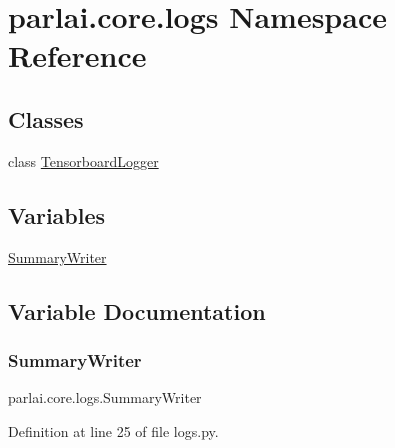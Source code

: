 \hypertarget{namespaceparlai_1_1core_1_1logs}{}\section{parlai.\+core.\+logs Namespace Reference}
\label{namespaceparlai_1_1core_1_1logs}
\subsection*{Classes}
\begin{DoxyCompactItemize}
\item 
class \hyperlink{classparlai_1_1core_1_1logs_1_1TensorboardLogger}{Tensorboard\+Logger}
\end{DoxyCompactItemize}
\subsection*{Variables}
\begin{DoxyCompactItemize}
\item 
\hyperlink{namespaceparlai_1_1core_1_1logs_a214c91224d7834e7962d77d49f17bbc4}{Summary\+Writer}
\end{DoxyCompactItemize}


\subsection{Variable Documentation}
\mbox{\label{namespaceparlai_1_1core_1_1logs_a214c91224d7834e7962d77d49f17bbc4}} 
\subsubsection{\texorpdfstring{Summary\+Writer}{SummaryWriter}}
{\footnotesize\ttfamily parlai.\+core.\+logs.\+Summary\+Writer}



Definition at line 25 of file logs.\+py.

